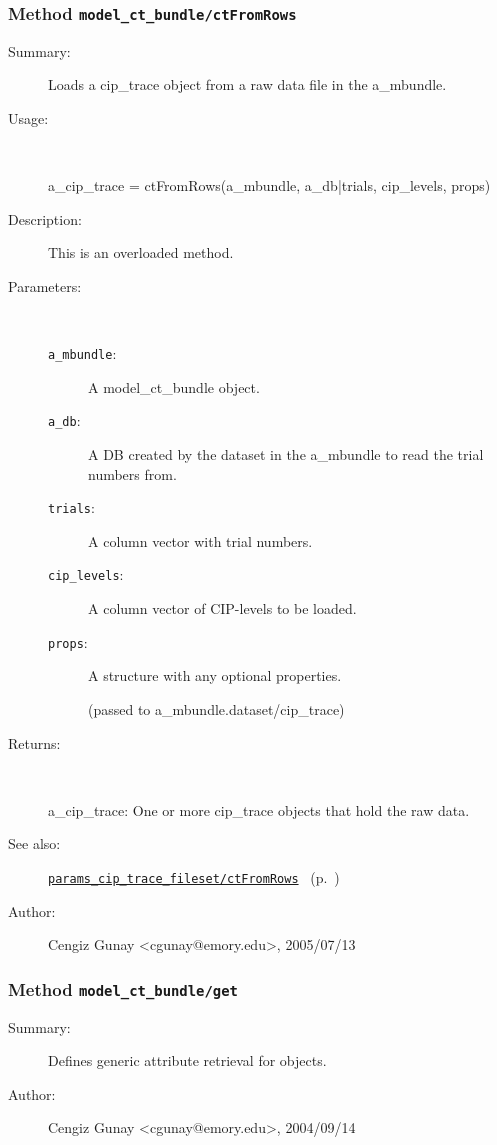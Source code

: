 \subsubsection[Method \texttt{ctFromRows}]{Method \texttt{model\_ct\_bundle/ctFromRows}}%
%
\label{ref_model_ct_bundle__ctFromRows}%
\hypertarget{ref_model_ct_bundle__ctFromRows}{}%
\begin{description}
\item[Summary:]Loads a cip\_trace object from a raw data file in the a\_mbundle.
%
\item[Usage:]~%
\begin{lyxcode}%
a\_cip\_trace = ctFromRows(a\_mbundle, a\_db|trials, cip\_levels, props)
%
\end{lyxcode}%
%
\item[Description:]%
This is an overloaded method.
\item[Parameters:]~
\begin{description}%
\item[\texttt{a\_mbundle}:]
 A model\_ct\_bundle object.
\item[\texttt{a\_db}:]
 A DB created by the dataset in the a\_mbundle to read the trial numbers from.
\item[\texttt{trials}:]
 A column vector with trial numbers.
\item[\texttt{cip\_levels}:]
 A column vector of CIP-levels to be loaded.
\item[\texttt{props}:]
 A structure with any optional properties.

(passed to a\_mbundle.dataset/cip\_trace)
\end{description}%
%
\item[Returns:
]~

	a\_cip\_trace: One or more cip\_trace objects that hold the raw data.
%
%
\item[See also:]%
\hyperlink{ref_params_cip_trace_fileset__ctFromRows}{\texttt{params\_cip\_trace\_fileset/ctFromRows}}%
\ (p.~\pageref{ref_params_cip_trace_fileset__ctFromRows})%
%
%
\item[Author:]%
Cengiz Gunay <cgunay@emory.edu>, 2005/07/13
%
\end{description}
\methodline%
\subsubsection[Method \texttt{get}]{Method \texttt{model\_ct\_bundle/get}}%
%
\label{ref_model_ct_bundle__get}%
\hypertarget{ref_model_ct_bundle__get}{}%
\begin{description}
\item[Summary:]Defines generic attribute retrieval for objects.
%
%
%
%
%
%
%
\item[Author:]%
Cengiz Gunay <cgunay@emory.edu>, 2004/09/14
%
\end{description}
\methodline%
